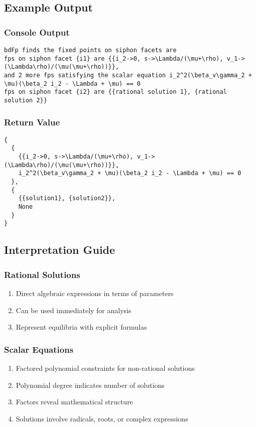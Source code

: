 \documentclass{article}
\begin{document}
\subsection{Example Output}

\subsubsection{Console Output}
\begin{verbatim}
bdFp finds the fixed points on siphon facets are
fps on siphon facet {i1} are {{i_2->0, s->\Lambda/(\mu+\rho), v_1->(\Lambda\rho)/(\mu(\mu+\rho))}},
and 2 more fps satisfying the scalar equation i_2^2(\beta_v\gamma_2 + \mu)(\beta_2 i_2 - \Lambda + \mu) == 0
fps on siphon facet {i2} are {{rational solution 1}, {rational solution 2}}
\end{verbatim}

\subsubsection{Return Value}
\begin{lstlisting}
{
  {
    {{i_2->0, s->\Lambda/(\mu+\rho), v_1->(\Lambda\rho)/(\mu(\mu+\rho))}},
    i_2^2(\beta_v\gamma_2 + \mu)(\beta_2 i_2 - \Lambda + \mu) == 0
  },
  {
    {{solution1}, {solution2}},
    None
  }
}
\end{lstlisting}

\subsection{Interpretation Guide}

\subsubsection{Rational Solutions}
\begin{enumerate}
\item Direct algebraic expressions in terms of parameters
\item Can be used immediately for analysis
\item Represent equilibria with explicit formulas
\end{enumerate}

\subsubsection{Scalar Equations}
\begin{enumerate}
\item Factored polynomial constraints for non-rational solutions
\item Polynomial degree indicates number of solutions
\item Factors reveal mathematical structure
\item Solutions involve radicals, roots, or complex expressions
\end{enumerate}
\end{document}

